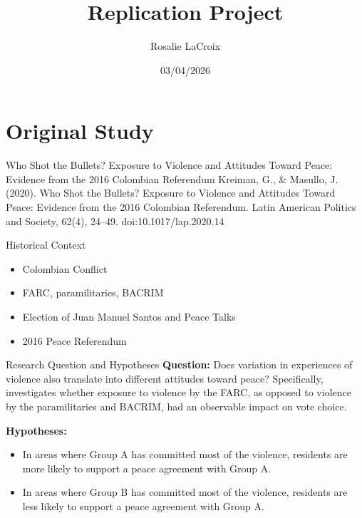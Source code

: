\documentclass{beamer}
\title[Replication Project]{Replication Project}
\author{Rosalie LaCroix}
\institute{Applied Stats II}
\date{03/04/2026}
\begin{document}
	
	\begin{frame}
		\titlepage
	\end{frame}
	
	
	\section{Original Study}
	
	\begin{frame}{Who Shot the Bullets? Exposure to Violence and Attitudes Toward Peace: Evidence from the 2016 Colombian Referendum}
		Kreiman, G., \& Masullo, J. (2020). Who Shot the Bullets? Exposure to Violence and Attitudes Toward Peace: Evidence from the 2016 Colombian Referendum. Latin American Politics and Society, 62(4), 24–49. doi:10.1017/lap.2020.14
	\end{frame}
	
	\begin{frame}{Historical Context}
		\begin{itemize}
			\item Colombian Conflict
				\item FARC, paramilitaries, BACRIM
			\item Election of Juan Manuel Santos and Peace Talks
			\item 2016 Peace Referendum
		\end{itemize}	
	\end{frame}
	
	\begin{frame}{Research Question and Hypotheses}
		\textbf{Question:} Does variation in experiences of violence also translate into different attitudes toward peace? Specifically, investigates whether exposure to violence by the FARC, as opposed to violence by the paramilitaries and BACRIM, had an observable impact on vote choice.
		
		\textbf{Hypotheses:}
		
		\begin{itemize}
			\item In areas where Group A has committed most of the violence, residents are more likely to support a peace agreement with Group A.
			\item In areas where Group B has committed most of the violence, residents are less likely to support a peace agreement with Group A.
		\end{itemize}
	\end{frame}
	
\end{document}
